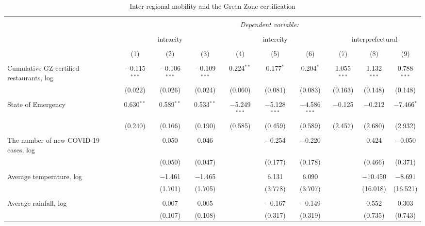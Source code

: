 
\begin{table}[!htbp] \centering 
  \caption{Inter-regional mobility and the Green Zone certification} 
  \label{} 
\scriptsize 
\begin{tabular}{@{\extracolsep{1pt}}lccccccccc} 
\\[-1.8ex]\hline 
\hline \\[-1.8ex] 
 & \multicolumn{9}{c}{\textit{Dependent variable:}} \\ 
\cline{2-10} 
\\[-1.8ex] & \multicolumn{3}{c}{intracity} & \multicolumn{3}{c}{intercity} & \multicolumn{3}{c}{interprefectural} \\ 
\\[-1.8ex] & (1) & (2) & (3) & (4) & (5) & (6) & (7) & (8) & (9)\\ 
\hline \\[-1.8ex] 
 Cumulative GZ-certified restaurants, log & $-$0.115$^{***}$ & $-$0.106$^{***}$ & $-$0.109$^{***}$ & 0.224$^{**}$ & 0.177$^{*}$ & 0.204$^{*}$ & 1.055$^{***}$ & 1.132$^{***}$ & 0.788$^{***}$ \\ 
  & (0.022) & (0.026) & (0.024) & (0.060) & (0.081) & (0.083) & (0.163) & (0.148) & (0.148) \\ 
  & & & & & & & & & \\ 
 State of Emergency & 0.630$^{**}$ & 0.589$^{**}$ & 0.533$^{**}$ & $-$5.249$^{***}$ & $-$5.128$^{***}$ & $-$4.586$^{***}$ & $-$0.125 & $-$0.212 & $-$7.466$^{*}$ \\ 
  & (0.240) & (0.166) & (0.190) & (0.585) & (0.459) & (0.589) & (2.457) & (2.680) & (2.932) \\ 
  & & & & & & & & & \\ 
 The number of new COVID-19 cases, log &  & 0.050 & 0.046 &  & $-$0.254 & $-$0.220 &  & 0.424 & $-$0.050 \\ 
  &  & (0.050) & (0.047) &  & (0.177) & (0.178) &  & (0.466) & (0.371) \\ 
  & & & & & & & & & \\ 
 Average temperature, log &  & $-$1.461 & $-$1.465 &  & 6.131 & 6.090 &  & $-$10.450 & $-$8.691 \\ 
  &  & (1.701) & (1.705) &  & (3.778) & (3.707) &  & (16.018) & (16.521) \\ 
  & & & & & & & & & \\ 
 Average rainfall, log &  & 0.007 & 0.005 &  & $-$0.167 & $-$0.149 &  & 0.552 & 0.303 \\ 
  &  & (0.107) & (0.108) &  & (0.317) & (0.319) &  & (0.735) & (0.743) \\ 

\end{tabular}
\end{table}
